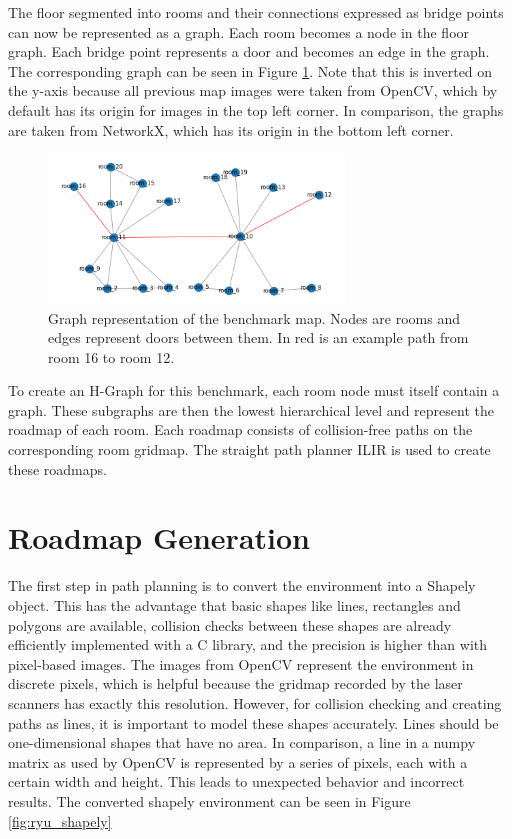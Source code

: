 The floor segmented into rooms and their connections expressed as bridge points can now be represented as a graph. Each room becomes a node in the floor graph. Each bridge point represents a door and becomes an edge in the graph. The corresponding graph can be seen in Figure \ref{fig:ryu_graph}. Note that this is inverted on the y-axis because all previous map images were taken from OpenCV, which by default has its origin for images in the top left corner. In comparison, the graphs are taken from NetworkX, which has its origin in the bottom left corner. 

\begin{figure}[h]
    \centering
    \includegraphics[width=0.7\textwidth]{figures/50_implementation/ryu_floor_graph.png}
    \caption[Graph representation of the benchmark map]{Graph representation of the benchmark map. Nodes are rooms and edges represent doors between them. In red is an example path from room 16 to room 12.}
    \label{fig:ryu_graph}
\end{figure}

To create an H-Graph for this benchmark, each room node must itself contain a graph. These subgraphs are then the lowest hierarchical level and represent the roadmap of each room. Each roadmap consists of collision-free paths on the corresponding room gridmap. The straight path planner ILIR is used to create these roadmaps.

\section{Roadmap Generation}
\label{sec:roadmap_generation}
The first step in path planning is to convert the environment into a Shapely object. This has the advantage that basic shapes like lines, rectangles and polygons are available, collision checks between these shapes are already efficiently implemented with a C library, and the precision is higher than with pixel-based images. The images from OpenCV represent the environment in discrete pixels, which is helpful because the gridmap recorded by the laser scanners has exactly this resolution. However, for collision checking and creating paths as lines, it is important to model these shapes accurately. Lines should be one-dimensional shapes that have no area. In comparison, a line in a numpy matrix as used by OpenCV is represented by a series of pixels, each with a certain width and height. This leads to unexpected behavior and incorrect results. The converted shapely environment can be seen in Figure \ref{fig:ryu_shapely}

